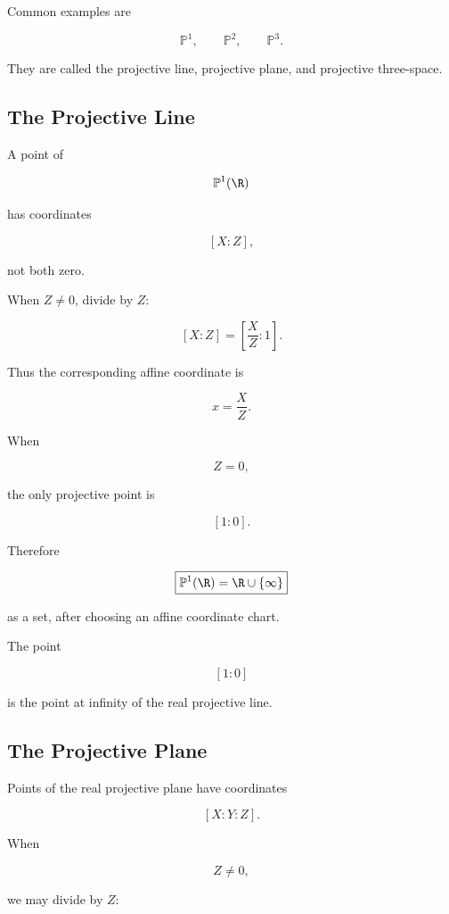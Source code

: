 Common examples are

\[
\mathbb{P}^{1},\qquad
\mathbb{P}^{2},\qquad
\mathbb{P}^{3}.
\]

They are called the projective line, projective plane, and projective
three-space.

\subsection{The Projective Line}
\label{subsec:projective-line}

A point of

\[
\mathbb{P}^{1}(\R)
\]

has coordinates

\[
[X:Z],
\]

not both zero.

When \(Z\neq0\), divide by \(Z\):

\[
[X:Z]
=
\left[\frac{X}{Z}:1\right].
\]

Thus the corresponding affine coordinate is

\[
x=\frac{X}{Z}.
\]

When

\[
Z=0,
\]

the only projective point is

\[
[1:0].
\]

Therefore

\[
\boxed{
\mathbb{P}^{1}(\R)
=
\R\cup\{\infty\}
}
\]

as a set, after choosing an affine coordinate chart.

The point

\[
[1:0]
\]

is the point at infinity of the real projective line.

\subsection{The Projective Plane}
\label{subsec:projective-plane}

Points of the real projective plane have coordinates

\[
[X:Y:Z].
\]

When

\[
Z\neq0,
\]

we may divide by \(Z\):

